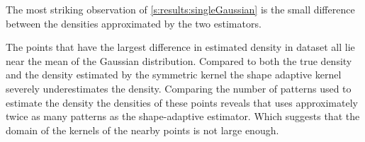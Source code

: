 
	The most striking observation of \cref{s:results:singleGaussian} is the small difference between the densities approximated by the two estimators. 










	The points that have the largest difference in estimated density in dataset \ferdosiOne all lie near the mean of the Gaussian distribution. Compared to both the true density and the density estimated by the symmetric kernel the shape adaptive kernel severely underestimates the density. Comparing the number of patterns used to estimate the density the densities of these points reveals that \mbe uses approximately twice as many patterns as the shape-adaptive estimator. Which suggests that the domain of the kernels of the nearby points is not large enough. 


